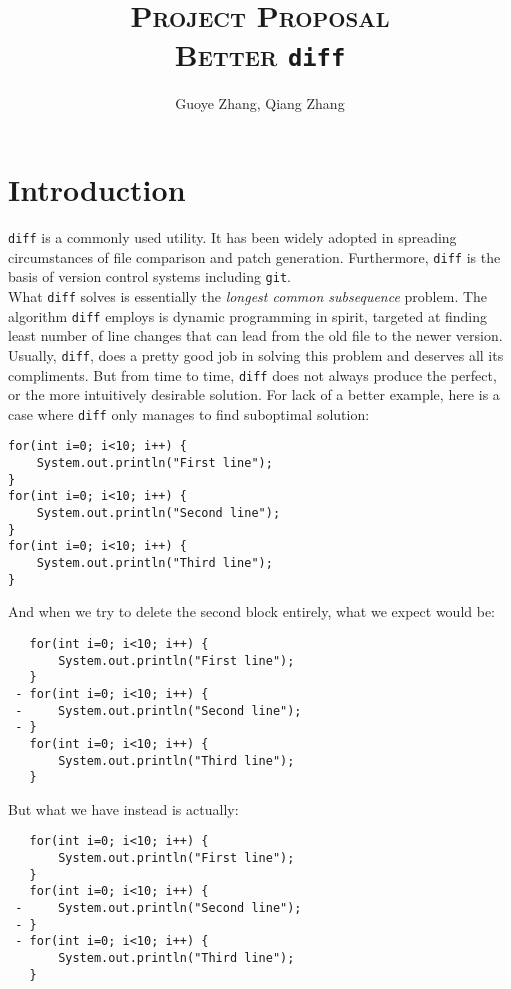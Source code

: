 \documentclass{article}
\begin{document}
\title{\textsc{Project Proposal}\\ \textbf{\textsc{Better } \texttt{diff}}} %
\author{Guoye Zhang, Qiang Zhang\\
        }  %
\date{ }  %
\maketitle

\section{Introduction}
\texttt{diff} is a commonly used utility. It has been widely adopted in spreading circumstances of file comparison and patch generation. Furthermore, \texttt{diff} is the basis of version control systems including \texttt{git}.\\

What \texttt{diff} solves is essentially the \textit{longest common subsequence} problem. The algorithm \texttt{diff} employs is dynamic programming in spirit, targeted at finding least number of line changes that can lead from the old file to the newer version. Usually, \texttt{diff}, does a pretty good job in solving this problem and deserves all its compliments. But from time to time, \texttt{diff} does not always produce the perfect, or the more intuitively desirable solution. For lack of a better example, here is a case where \texttt{diff} only manages to find suboptimal solution:\\
\begin{lstlisting}
for(int i=0; i<10; i++) {
    System.out.println("First line");
}
for(int i=0; i<10; i++) {
    System.out.println("Second line");
}
for(int i=0; i<10; i++) {
    System.out.println("Third line");
}
\end{lstlisting}

And when we try to delete the second block entirely, what we expect would be:
\begin{lstlisting}
   for(int i=0; i<10; i++) {
       System.out.println("First line");
   }
 - for(int i=0; i<10; i++) {
 -     System.out.println("Second line");
 - }
   for(int i=0; i<10; i++) {
       System.out.println("Third line");
   }
\end{lstlisting}

\pagebreak
But what we have instead is actually:
\begin{lstlisting}
   for(int i=0; i<10; i++) {
       System.out.println("First line");
   }
   for(int i=0; i<10; i++) {
 -     System.out.println("Second line");
 - }
 - for(int i=0; i<10; i++) {
       System.out.println("Third line");
   }
\end{lstlisting}
\end{document}

